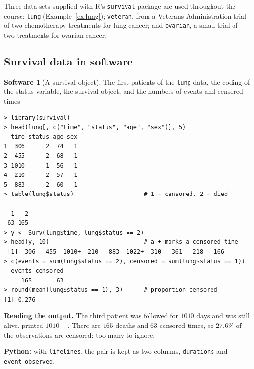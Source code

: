 \documentclass[11pt,a4paper]{article}
\numberwithin{equation}{section}
\theoremstyle{definition}
\newtheorem{software}[thm]{Software}
\begin{document}
Three data sets supplied with R's \texttt{survival} package are used throughout the course: \texttt{lung} (Example~\ref{ex:lung}); \texttt{veteran}, from a Veterans Administration trial of two chemotherapy treatments for lung cancer; and \texttt{ovarian}, a small trial of two treatments for ovarian cancer.

\subsection{Survival data in software}
\label{ssec:software1}

\begin{software}[A survival object]
\label{sw:surv}
The first patients of the \texttt{lung} data, the coding of the status variable, the survival object, and the numbers of events and censored times:
{\small\begin{verbatim}
> library(survival)
> head(lung[, c("time", "status", "age", "sex")], 5)
  time status age sex
1  306      2  74   1
2  455      2  68   1
3 1010      1  56   1
4  210      2  57   1
5  883      2  60   1
> table(lung$status)                    # 1 = censored, 2 = died

  1   2 
 63 165 
> y <- Surv(lung$time, lung$status == 2)
> head(y, 10)                           # a + marks a censored time
 [1]  306   455  1010+  210   883  1022+  310   361   218   166 
> c(events = sum(lung$status == 2), censored = sum(lung$status == 1))
  events censored 
     165       63 
> round(mean(lung$status == 1), 3)      # proportion censored
[1] 0.276
\end{verbatim}}
\textbf{Reading the output.} The third patient was followed for $1010$ days and was still alive, printed $1010+$. There are $165$ deaths and $63$ censored times, so $27.6\%$ of the observations are censored: too many to ignore.

\textbf{Python:} with \texttt{lifelines}, the pair is kept as two columns, \texttt{durations} and \texttt{event\_observed}.
\end{software}
\end{document}
